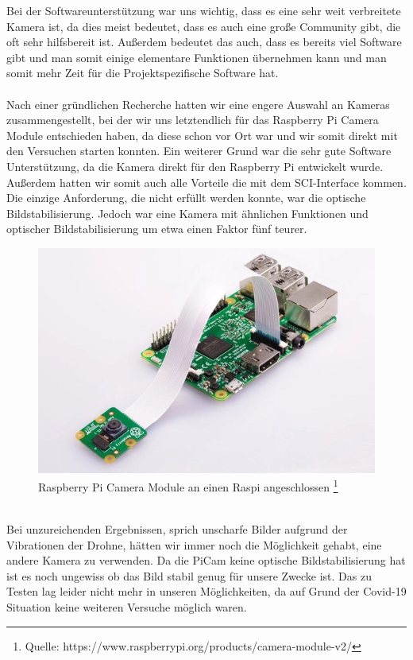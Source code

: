 Bei der Softwareunterstützung war uns wichtig, dass es eine sehr weit verbreitete Kamera ist, da dies meist bedeutet, dass es auch eine große Community gibt, die oft sehr hilfsbereit ist. Außerdem bedeutet das auch, dass es bereits viel Software gibt und man somit einige elementare Funktionen übernehmen kann und man somit mehr Zeit für die Projektspezifische Software hat.\\
\\
Nach einer gründlichen Recherche hatten wir eine engere Auswahl an Kameras zusammengestellt, bei der wir uns letztendlich für das Raspberry Pi Camera Module entschieden haben, da diese schon vor Ort war und wir somit direkt mit den Versuchen starten konnten. Ein weiterer Grund war die sehr gute Software Unterstützung, da die Kamera direkt für den Raspberry Pi entwickelt wurde. Außerdem hatten wir somit auch alle Vorteile die mit dem SCI-Interface kommen. Die einzige Anforderung, die nicht erfüllt werden konnte, war die optische Bildstabilisierung. Jedoch war eine Kamera mit ähnlichen Funktionen und optischer Bildstabilisierung um etwa einen Faktor fünf teurer.
\\
\begin{figure}[h]
	\centering
	\includegraphics[scale=0.6]{"Grafiken/PiCam.png"}
	\caption{Raspberry Pi Camera Module an einen Raspi angeschlossen \footnote{Quelle: https://www.raspberrypi.org/products/camera-module-v2/}}
	\label{fig:picam}
\end{figure}
\\
Bei unzureichenden Ergebnissen, sprich unscharfe Bilder aufgrund der Vibrationen der Drohne, hätten wir immer noch die Möglichkeit gehabt, eine andere Kamera zu verwenden. Da die PiCam keine optische Bildstabilisierung hat ist es noch ungewiss ob das Bild stabil genug für unsere Zwecke ist. Das zu Testen lag leider nicht mehr in unseren Möglichkeiten, da auf Grund der Covid-19 Situation keine weiteren Versuche  möglich waren.
\newpage
